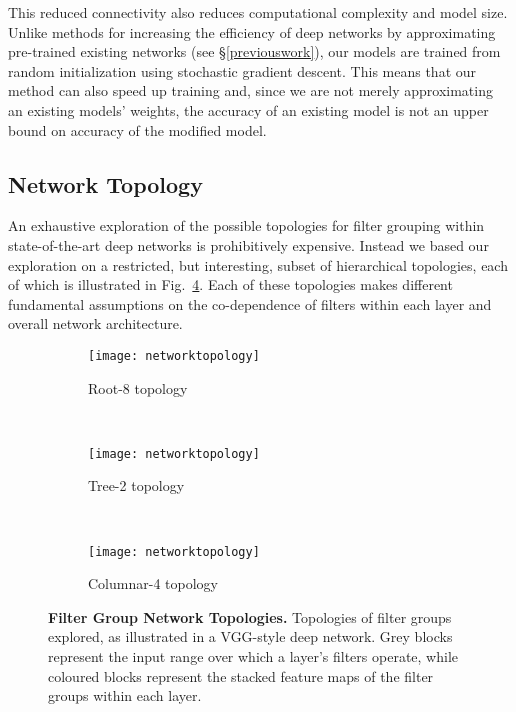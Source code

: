 \documentclass[thesis]{subfiles}
\begin{document}
	This reduced connectivity also reduces computational complexity and model size. Unlike methods for increasing the efficiency of deep networks by approximating pre-trained existing networks (see \S\ref{previouswork}), our models are trained from random initialization using stochastic gradient descent. This means that our method can also speed up training and, since we are not merely approximating an existing models' weights, the accuracy of an existing model is not an upper bound on accuracy of the modified model.
	
	\subsection{Network Topology}
	An exhaustive exploration of the possible topologies for filter grouping within state-of-the-art deep networks is prohibitively expensive. Instead we based our exploration on a restricted, but interesting, subset of hierarchical topologies, each of which is illustrated in Fig.~\ref{fig:networktopology}. 
	Each of these topologies makes different fundamental assumptions on the co-dependence of filters within each layer and overall network architecture.
	
	\begin{figure}[t]
		\centering
		\begin{subfigure}[b]{0.85\columnwidth}
			\texttt{[image: networktopology]}
			\caption{Root-8 topology}
			\label{fig:roottopology}
		\end{subfigure}
		~
		\begin{subfigure}[b]{0.85\columnwidth}
			\texttt{[image: networktopology]}
			\caption{Tree-2 topology}
			\label{fig:treetopology}
		\end{subfigure}
		~
		\begin{subfigure}[b]{0.85\columnwidth}
			\texttt{[image: networktopology]}
			\caption{Columnar-4 topology}
			\label{fig:columntopology}
		\end{subfigure}
		\caption[Filter group network topologies]{\textbf{Filter Group Network Topologies.} Topologies of filter groups explored, as illustrated in a VGG-style deep network. Grey blocks represent the input range over which a layer's filters operate, while coloured blocks represent the stacked feature maps of the filter groups within each layer. 
		}
		\label{fig:networktopology}
	\end{figure}
	
\end{document}
